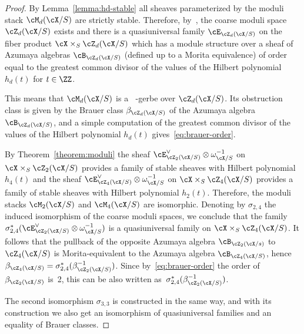 \documentclass[11pt]{amsart}
\DeclareMathOperator{\Gm}{{\mathrm{G}_{\mathrm{m}}}}
\theoremstyle{plain}
\theoremstyle{definition}
\theoremstyle{remark}
\begin{document}
\begin{proof}
By Lemma~\ref{lemma:hd-stable} all sheaves parameterized by the moduli stack $\cM_d(\cX/S)$ are strictly stable.
Therefore, by~\cite[Theorem~4.3.7]{huybrechts1997geometry}, the coarse moduli space ${\cZ_d(\cX/S)}$ exists and 
there is a quasiuniversal family $\cE_{\cZ_d(\cX/S)}$ on the fiber product $\cX \times_S \cZ_d{(\cX/S)}$ which has a module structure over
a sheaf of Azumaya algebras $\cB_{\cZ_d(\cX/S)}$ (defined up to a Morita equivalence) 
of order equal to the greatest common divisor of the values of the Hilbert polynomial $h_d(t)$ for $t \in \ZZ$.

This means that $\cM_d(\cX/S)$ is a $\Gm$-gerbe over $\cZ_d(\cX/S)$.
Its obstruction class is given by the Brauer class $\beta_{\cZ_d(\cX/S)}$ of the Azumaya algebra $\cB_{\cZ_d(\cX/S)}$, 
and a simple computation of the greatest common divisor of the values of the Hilbert polynomial $h_d(t)$ gives~\eqref{eq:brauer-order}.

By Theorem~\ref{theorem:moduli} the sheaf $\cE^\vee_{\cZ_2(\cX/S)} \otimes \omega_{\cX/S}^{-1}$ on $\cX \times_S \cZ_2(\cX/S)$ provides a family of stable sheaves with Hilbert polynomial $h_4(t)$
and the sheaf $\cE^\vee_{\cZ_4(\cX/S)} \otimes \omega_{\cX/S}^{-1}$ on $\cX \times_S \cZ_4(\cX/S)$ provides a family of stable sheaves with Hilbert polynomial $h_2(t)$.
Therefore, the moduli stacks $\cM_2(\cX/S)$ and $\cM_4(\cX/S)$ are isomorphic.
Denoting by $\sigma_{2,4}$ the induced isomorphism of the coarse moduli spaces, we conclude that 
the family $\sigma_{2,4}^*(\cE^\vee_{\cZ_2(\cX/S)} \otimes \omega_{\cX/S}^{-1})$ is a quasiuniversal family on $\cX \times_S \cZ_4(\cX/S)$.
It follows that the pullback of the opposite Azumaya algebra $\cB_{\cZ_2(\cX/s)}$ to $\cZ_4(\cX/S)$ is Morita-equivalent 
to the Azumaya algebra $\cB_{\cZ_4(\cX/S)}$, hence $\beta_{\cZ_4(\cX/S)} = \sigma_{2,4}^*(\beta_{\cZ_2(\cX/S)}^{-1})$.
Since by~\eqref{eq:brauer-order} the order of $\beta_{\cZ_2(\cX/S)}$ is~2, 
this can be also written as~$\sigma_{2,4}^*(\beta_{\cZ_2(\cX/S)}^{-1})$.


The second isomorphism $\sigma_{3,3}$ is constructed in the same way, and with its construction we also get an isomorphism of quasiuniversal families and an equality of Brauer classes.
\end{proof}
\end{document}
